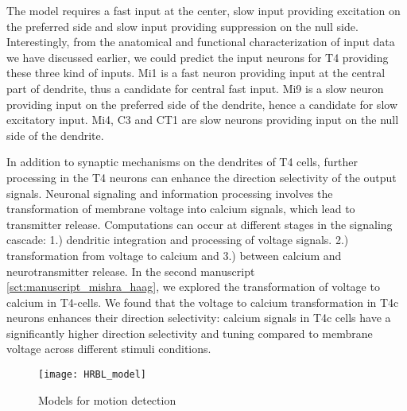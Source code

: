 The model requires a fast input at the center, slow input providing excitation on the preferred side and slow input providing suppression on the null side. Interestingly, from the anatomical and functional characterization of input data we have discussed earlier, we could predict the input neurons for T4 providing these three kind of inputs. Mi1 is a fast neuron providing input at the central part of dendrite, thus a candidate for central fast input. Mi9 is a slow neuron providing input on the preferred side of the dendrite, hence a candidate for slow excitatory input. Mi4, C3 and CT1 are slow neurons providing input on the null side of the dendrite. 

In addition to synaptic mechanisms on the dendrites of T4 cells, further processing in the T4 neurons can enhance the direction selectivity of the output signals. Neuronal signaling and information processing involves the transformation of membrane voltage into calcium signals, which lead to transmitter release. Computations can occur at different stages in the signaling cascade: 1.) dendritic integration and processing of voltage signals. 2.) transformation from voltage to calcium and 3.) between calcium and neurotransmitter release. In the second manuscript \ref{sct:manuscript_mishra_haag}, we explored the transformation of voltage to calcium in T4-cells. We found that the voltage to calcium transformation in T4c neurons enhances their direction selectivity: calcium signals in T4c cells have a significantly higher direction selectivity and tuning compared to membrane voltage across different stimuli conditions. 
\begin{figure}
\centering
\hspace*{-2cm} 
\texttt{[image: HRBL\_model]}
\caption[Models for motion detection] {Models for motion detection}
\label{fig:hrblmodel}
\end{figure}




